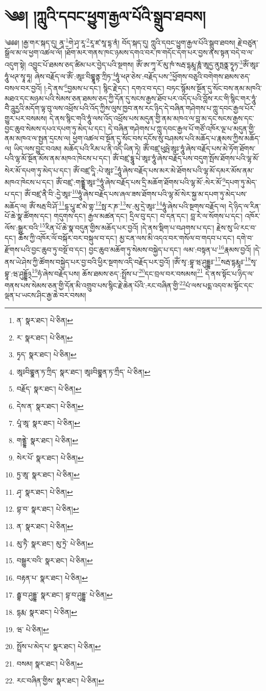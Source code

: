 \setcounter{footnote}{0} 
\chapter{༄༅། །ཀླུའི་དབང་ཕྱུག་རྒྱལ་པོའི་སྒྲུབ་ཐབས།}༄༅༅། །རྒྱ་གར་སྐད་དུ། ནཱ་\footnote{ན་  སྣར་ཐང་།  པེ་ཅིན། }གེ་ཤྭ་རཱ་\footnote{ར་  སྣར་ཐང་།  པེ་ཅིན། }རཱ་ཛ་སཱ་དྷ་ནཾ། བོད་སྐད་དུ། ཀླུའི་དབང་ཕྱུག་རྒྱལ་པོའི་སྒྲུབ་ཐབས། རྗེ་བཙུན་སྒྲོལ་མ་ལ་ཕྱག་འཚལ་ལོ། །ཐོག་མར་གནས་ཁང་ཉམས་དགའ་བར་ཁ་གདོང་དག་པར་བྱས་ནས་སྟན་བདེ་བ་ལ་འདུག་སྟེ། འབྱུང་པོ་ཐམས་ཅད་ཚིམ་པར་བྱེད་པའི་སྔགས། ཨོཾ་ཨ་ཀཱ་རོ་མུ་ཁཾ་སརྦ་དྷརྨཱ་ཎཱཾ་ཨཱདྱ་ནུཏྤནྣ་ཏྭཱཏ་\footnote{ཏྭད་  སྣར་ཐང་།  པེ་ཅིན། }ཨོཾ་ཨཱཿ་ཧཱུཾ་ཕཊ་སྭཱ་ཧཱ། ཞེས་བརྗོད་ལ་ཨོཾ་:ཨཱཿ་བིགྷྣཱནྟ་ཀྲིཏ་\footnote{ཨཱཿབིགྷྣན་ཏ་ཀྲིད་  སྣར་ཐང་། ཨཱཿབིགྷྣན་ཏ་ཀྲྀད་  པེ་ཅིན། }ཧཱུཾ་ཕཊ་ཅེས་:བརྗོད་པས་\footnote{བརྗོད་  སྣར་ཐང་།  པེ་ཅིན། }ཕྱོགས་བཅུའི་བགེགས་ཐམས་ཅད་བསལ་བར་བྱའོ། །:དེ་ནས་\footnote{དེས་ན་  སྣར་ཐང་།  པེ་ཅིན། }བྱམས་པ་དང་། སྙིང་རྗེ་དང་། དགའ་བ་དང་། བཏང་སྙོམས་སྔོན་དུ་སོང་བས་ནམ་མཁའི་མཐའ་དང་མཉམ་པའི་སེམས་ཅན་ཐམས་ཅད་ཀྱི་དོན་དུ་སངས་རྒྱས་ཐོབ་པར་འདོད་པའི་བློས་རང་གི་སྙིང་གར་ཧཱུཾ་བཻ་ཌཱུརྱའི་མདོག་ལྟ་བུ་ལས་འཕྲོས་པའི་འོད་ཀྱིས་ལུས་ཁྱབ་ནས་རང་ཉིད་དེ་བཞིན་གཤེགས་པ་ཀླུ་དབང་རྒྱལ་པོར་གྱུར་པར་བསམས། དེ་ནས་སྙིང་གའི་ཧཱུཾ་ལས་འོད་འཕྲོས་པས་མདུན་གྱི་ནམ་མཁའ་ལ་བླ་མ་དང་སངས་རྒྱས་དང་བྱང་ཆུབ་སེམས་དཔའ་དཔག་ཏུ་མེད་པ་དང་། དེ་བཞིན་གཤེགས་པ་ཀླུ་དབང་རྒྱལ་པོ་གཙོ་འཁོར་ལྔ་པ་མདུན་གྱི་ནམ་མཁའ་ལ་སྤྱན་དྲངས་ལ། ཕྱག་འཚལ་བ་སྔོན་དུ་སོང་བས་དངོས་སུ་བཤམས་པའི་མཆོད་པ་རྣམས་ཀྱིས་མཆོད་ལ། ཡིད་ལས་བྱུང་བའམ། མཆོད་པའི་རིམ་པ་ནི་འདི་ཡིན་ཏེ། ཨོཾ་བཛྲ་ཕུཥྤེ་ཨཱཿ་ཧཱུཾ་ཞེས་བརྗོད་པས་མེ་ཏོག་ཐོགས་པའི་ལྷ་མོ་སྔོན་མོས་ནམ་མཁའ་ཁེངས་པ་དང་། ཨོཾ་བཛྲ་དྷཱུ་པེ་ཨཱཿ་ཧཱུཾ་ཞེས་བརྗོད་པས་བདུག་སྤོས་ཐོགས་པའི་ལྷ་མོ་སེར་མོ་དཔག་ཏུ་མེད་པ་དང་། ཨོཾ་བཛྲ་དཱི་:པེ་ཨཱཿ་\footnote{པཱཾ་ཨཱ་  སྣར་ཐང་།  པེ་ཅིན། }ཧཱུཾ་ཞེས་བརྗོད་པས་མར་མེ་ཐོགས་པའི་ལྷ་མོ་དམར་མོས་ནམ་མཁའ་ཁེངས་པ་དང་། ཨོཾ་བཛྲ་:གནྡྷེ་ཨཱཿ་\footnote{གནྡྷེ་  སྣར་ཐང་།  པེ་ཅིན། }ཧཱུཾ་ཞེས་བརྗོད་པས་དྲི་མཆོག་ཐོགས་པའི་ལྷ་མོ་:སེར་མོ་\footnote{སེར་པོ་  སྣར་ཐང་།  པེ་ཅིན། }དཔག་ཏུ་མེད་པ་དང་། ཨོཾ་བཛྲ་ནཻ་བི་:དྱེ་ཨཱཿ་\footnote{ཏྱ་ཨཱ་  སྣར་ཐང་།  པེ་ཅིན། }ཧཱུཾ་ཞེས་བརྗོད་པས་ཞལ་ཟས་ཐོགས་པའི་ལྷ་མོ་སེར་སྐྱ་མ་དཔག་ཏུ་མེད་པས་མཆོད་ལ། ཨོཾ་སརྦ་བི་ཤོ་\footnote{ཤྭ་  སྣར་ཐང་།  པེ་ཅིན། }དྷ་པཱུ་ཛ་མེ་གྷ་\footnote{བྷ་བ་  སྣར་ཐང་།  པེ་ཅིན། }སྥ་ར་ཎ་\footnote{ན་  སྣར་ཐང་།  པེ་ཅིན། }ས་:མུ་དྲེ་ཨཱཿ་\footnote{མུ་ཏཻ་  སྣར་ཐང་། མུ་ཏྲེ་  པེ་ཅིན། }ཧཱུཾ་ཞེས་པའི་སྔགས་བརྗོད་ལ། དེ་ཉིད་ལ་རིན་པོ་ཆེ་སྣ་ཚོགས་དང་། གདུགས་དང་། རྒྱལ་མཚན་དང་། དྲིལ་བུ་དང་། བ་དན་དང་། བླ་རེ་ལ་སོགས་པ་དང་། འཁོར་ལོས་:སྒྱུར་བའི་\footnote{བསྒྱུར་བའི་  སྣར་ཐང་།  པེ་ཅིན། }རིན་པོ་ཆེ་སྣ་བདུན་གྱིས་མཆོད་པར་བྱའོ། །དེ་ནས་སྡིག་པ་བཤགས་པ་དང་། རྗེས་སུ་ཡི་རང་བ་དང་། ཆོས་ཀྱི་འཁོར་ལོ་བསྐོར་བར་བསྐུལ་བ་དང་། མྱ་ངན་ལས་མི་འདའ་བར་གསོལ་བ་གདབ་པ་དང་། དགེ་བ་རྫོགས་པའི་བྱང་ཆུབ་ཏུ་བསྔོ་བ་དང་། བྱང་ཆུབ་མཆོག་ཏུ་སེམས་བསྐྱེད་པ་དང་། ལམ་:བསྟན་པ་\footnote{བརྟན་པ་  སྣར་ཐང་།  པེ་ཅིན། }རྣམས་བྱའོ། །དེ་ནས་ཡེ་ཤེས་ཀྱི་ཚོགས་བསྐྱེད་པར་བྱ་བའི་ཕྱིར་སྔགས་འདི་བརྗོད་པར་བྱའོ། །ཨོཾ་སྭ་:བྷཱ་ཝ་ཤུདྡྷཿ་\footnote{རྦྷ་བ་ཤུདྡྷ་  སྣར་ཐང་། བྷ་བ་ཤུདྡྷ་  པེ་ཅིན། }སརྦ་དྷརྨཱཿ་\footnote{དྷརྨ་  སྣར་ཐང་།  པེ་ཅིན། }སྭ་བྷཱ་:ཝ་ཤུདྡྷོ྅\footnote{ཝ་  པེ་ཅིན། }ཧཾ་ཞེས་བརྗོད་པས། ཆོས་ཐམས་ཅད་:སྤྲོས་པ་\footnote{སྤྲོས་པ་མེད་པ་  སྣར་ཐང་།  པེ་ཅིན། }དང་བྲལ་བར་བསམས།\footnote{བསམ།  སྣར་ཐང་།  པེ་ཅིན། } དེ་ནས་སྟོང་པ་ཉིད་ལ་གནས་པས་སེམས་ཅན་གྱི་དོན་མི་འགྲུབ་པས་སྙིང་རྗེ་ཆེན་པོའི་:རང་བཞིན་གྱི་\footnote{རང་བཞིན་གྱིས་  སྣར་ཐང་།  པེ་ཅིན། }པཾ་ལས་པདྨ་འདབ་མ་སྟོང་དང་ལྡན་པ་ཡངས་ཤིང་རྒྱ་ཆེ་བར་བསམ། 